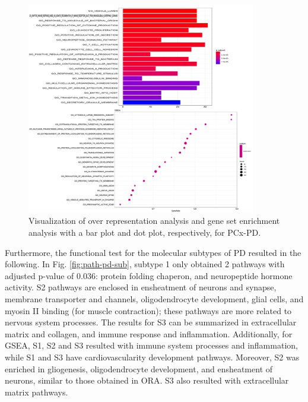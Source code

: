 \begin{figure}[ht]
    \centerline{\includegraphics[width = 10cm]{Figures/Path/Path-PCx-PD.jpg}}
\caption{Visualization of over representation analysis and gene set enrichment analysis with a bar plot and dot plot, respectively, for PCx-PD.}
\label{fig:path-pxc-pd}
\end{figure}

Furthermore, the functional test for the molecular subtypes of PD resulted in the following. In Fig. \ref{fig:path-pd-sub}, subtype 1 only obtained 2 pathways with adjusted p-value of 0.036: protein folding chaperon, and neuropeptide hormone activity. S2 pathways are enclosed in ensheatment of neurons and synapse, membrane transporter and channels, oligodendrocyte development, glial cells, and myosin II binding (for muscle contraction); these pathways are more related to nervous system processes. The results for S3 can be summarized in extracellular matrix and collagen, and immune response and inflammation. Additionally, for GSEA, S1, S2 and S3 resulted with immune system processes and inflammation, while S1 and S3 have cardiovascularity development pathways. Moreover, S2 was enriched in gliogenesis, oligodendrocyte development, and ensheatment of neurons, similar to those obtained in ORA. S3 also resulted with extracellular matrix pathways.


